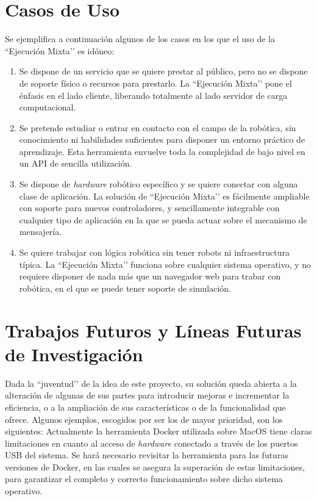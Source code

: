 \section{Casos de Uso }
Se ejemplifica a continuación algunos de los casos en los que el uso de la ``Ejecución Mixta’’ es idóneo:
\begin{enumerate}
\item Se dispone de un servicio que se quiere prestar al público, pero no se dispone de soporte físico o recursos para prestarlo. La ``Ejecución Mixta’’ pone el énfasis en el lado cliente, liberando totalmente al lado servidor de carga computacional.
\item Se pretende estudiar o entrar en contacto con el campo de la robótica, sin conocimiento ni habilidades suficientes para disponer un entorno práctico de aprendizaje. Esta herramienta envuelve toda la complejidad de bajo nivel en un API de sencilla utilización.
\item Se dispone de \textit{hardware} robótico específico y se quiere conectar con alguna clase de aplicación. La solución de ``Ejecución Mixta’’ es fácilmente ampliable con soporte para nuevos controladores, y sencillamente integrable con cualquier tipo de aplicación en la que se pueda actuar sobre el mecanismo de mensajería.
\item Se quiere trabajar con lógica robótica sin tener robots ni infraestructura típica. La ``Ejecución Mixta’’ funciona sobre cualquier sistema operativo, y no requiere disponer de nada más que un navegador web para trabar con robótica, en el que se puede tener soporte de simulación.
\end{enumerate}

\section{Trabajos Futuros y Líneas Futuras de Investigación }
Dada la ``juventud’’ de la idea de este proyecto, su solución queda abierta a la alteración de algunas de sus partes para introducir mejoras e incrementar la eficiencia, o a la ampliación de sus características o de la funcionalidad que ofrece. Algunos ejemplos, escogidos por ser los de mayor prioridad, son los siguientes:
Actualmente la herramienta Docker utilizada sobre MacOS tiene claras limitaciones en cuanto al acceso de \textit{hardware} conectado a través de los puertos USB del sistema. Se hará necesario revisitar la herramienta para las futuras versiones de Docker, en las cuales se asegura la superación de estas limitaciones, para garantizar el completo y correcto funcionamiento sobre dicho sistema operativo.

